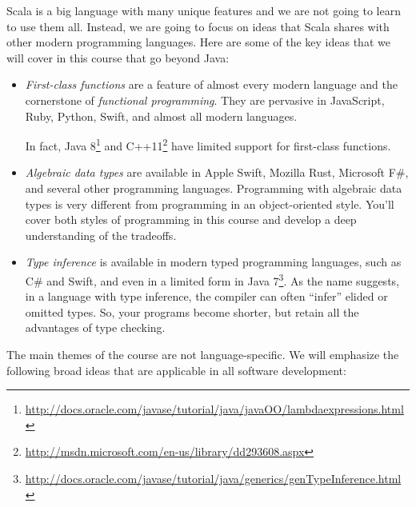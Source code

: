 \documentclass{book}
\begin{document}
Scala is a big language with many unique features and we are not going to learn
to use them all. Instead, we are going to focus on ideas that Scala shares with
other modern programming languages. Here are some of the key ideas that we will
cover in this course that go beyond Java:

\begin{itemize}

\item \emph{First-class functions} are a feature of almost every modern language
  and the cornerstone of \emph{functional programming}. They are pervasive in
  JavaScript, Ruby, Python, Swift, and almost all modern languages.

  In fact, Java 8\footnote{\url{http://docs.oracle.com/javase/tutorial/java/javaOO/lambdaexpressions.html}} and
  C++11\footnote{\url{http://msdn.microsoft.com/en-us/library/dd293608.aspx}}
  have limited support for first-class functions.

\item \emph{Algebraic data types} are available in Apple Swift, Mozilla Rust,
  Microsoft F\#, and several other programming languages. Programming with
  algebraic data types is very different from programming in an object-oriented
  style. You'll cover both styles of programming in this course and develop
  a deep understanding of the tradeoffs.

\item \emph{Type inference} is available in modern typed programming languages,
  such as C\# and Swift, and even in a limited form in Java
  7\footnote{\url{http://docs.oracle.com/javase/tutorial/java/generics/genTypeInference.html}}.
  As the name suggests, in a language with type inference, the compiler can
  often ``infer'' elided or omitted types. So, your programs become shorter, but
  retain all the advantages of type checking.

\end{itemize}

The main themes of the course are not language-specific. We will emphasize
the following broad ideas that are applicable in all software development:
\end{document}
